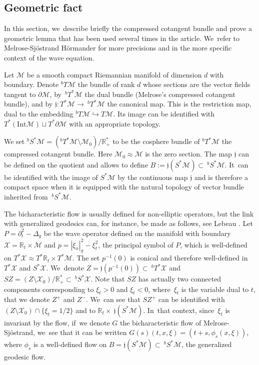 \documentclass[10pt]{amsart}
\theoremstyle{definition}
\let\mc\mathcal
\newcommand{\M}{\mc{M}}
\newcommand{\X}{\mc{X}}
\newcommand{\R}{\mathbb{R}}
\begin{document}
\subsection{Geometric fact}\label{s:geom}
In this section, we~describe briefly the compressed cotangent bundle and prove a geometric lemma that has been used several times in the article. We~refer to Melrose-Sjöstrand \cite{MS:78} Hörmander \cite[\S 18.3 \& 24.3]{H:07} for more precisions and \cite[\S 2.2]{BL:01} in the more specific context of the wave equation.

Let $\M$ be a smooth compact Riemannian manifold of dimension $d$ with boundary. Denote $^bT\M$ the bundle of rank $d$ whose sections are the vector fields tangent to $\partial \M$, by~$^bT^*\M$ the dual bundle (Melrose's compressed cotangent bundle), and by $\mathfrak{j}:T^*\M\rightarrow~ ^bT^*\M$ the canonical map. This is the restriction map, dual to the embedding $^bT\M\hookrightarrow T\M$. Its image can be identified with $T^* (\text{Int}\M) \sqcup T^* \partial\M$ with an appropriate topology.

We set $^bS^*\M=(^bT^*\M\setminus \M_0)/\R_+^*$ to be the cosphere bundle of $^bT^*\M$ the compressed cotangent bundle. Here $\M_0\approx \M$ is the zero section. The map $\mathfrak{j}$ can be defined on the quotient and allows to define $B:=\mathfrak{j}(S^*\M)\subset ~^bS^*\M$. It~can be identified with the image of $S^*\M$ by the continuous map $\mathfrak{j}$ and is therefore a compact space when it is equipped with the natural topology of vector bundle inherited from $~^bS^*\M$.

The bicharacteristic flow is usually defined for non-elliptic operators, but the link with generalized geodesics can, for instance, be made as follows, see Lebeau \cite[\S A.3]{L:96}. Let $P=\partial_t^2-\Delta_g$ be the wave operator defined on the manifold with boundary $\X=\R_t\times \M$ and $p=|\xi_x|_g^2-\xi_t^2$, the principal symbol of $P$, which is well-defined on $T^*\X\approx T^*\R_t\times T^*\M$. The set $p^{-1}(0)$ is conical and therefore well-defined in $T^*\X$ and $S^*\X$. We~denote $Z=\mathfrak{j}(p^{-1}(0))\subset~ ^bT^*\X$ and $SZ=(Z\setminus \X_0)/\R_+^*\subset ~ ^bS^*\X$. Note that $SZ$ has actually two connected components corresponding to $\xi_t>0$ and $\xi_t<0$, where~$\xi_t$ is the variable dual to $t$, that we denote $Z^+$ and $Z^-$. We~can see that $SZ^+$ can be identified with $(Z\setminus \X_0)\cap \{\xi_t=1/2\}$ and to $\R_t\times~ \mathfrak{j}(S^*\M)$. In~that context, since~$\xi_t$ is invariant by the flow, if~we denote $G$ the bicharacteristic flow of Melrose-Sjöstrand, we~see that it can be written $
G(s)(t,x,\xi)=(t+s,\phi_s (x,\xi))$, where $\phi_s$ is a well-defined flow on $B=\mathfrak{j}(S^*\M)\subset ~^bS^*\M$, the generalized geodesic flow.
\end{document}
